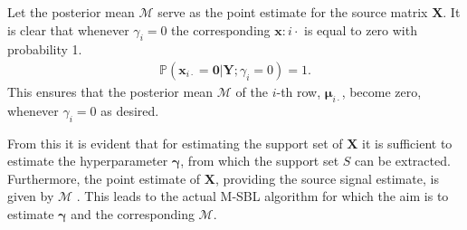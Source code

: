 Let the posterior mean $\mathcal{M}$ serve as the point estimate for the source matrix $\mathbf{X}$.
It is clear that whenever $\gamma_i = 0$ the corresponding $\textbf{x}:{i\cdot}$ is equal to zero with probability 1.
\begin{align*}
\mathbb{P}(\mathbf{x}_{i \cdot} = \mathbf{0} \vert \mathbf{Y} ; \gamma_i = 0) = 1.
\end{align*}
This ensures that the posterior mean $\mathcal{M}$ of the $i$-th row, $\boldsymbol{\mu}_{i \cdot}$, become zero, whenever $\gamma_i = 0$ as desired.

From this it is evident that for estimating the support set of $\mathbf{X}$ it is sufficient to estimate the hyperparameter $\boldsymbol{\gamma}$, from which the support set $S$ can be extracted. Furthermore, the point estimate of $\mathbf{X}$, providing the source signal estimate, is given by $\mathcal{M}$ \cite[p. 147]{phd_wipf}. 
This leads to the actual M-SBL algorithm for which the aim is to estimate $\boldsymbol{\gamma}$ and the corresponding $\mathcal{M}$.

